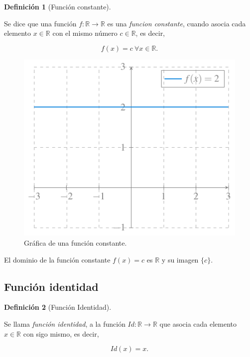 \documentclass[
  a4paper,
]{scrreport}
\theoremstyle{definition}
\theoremstyle{plain}
\theoremstyle{definition}
\newtheorem{definition}{Definición}[chapter]
\theoremstyle{definition}
\theoremstyle{plain}
\theoremstyle{plain}
\theoremstyle{remark}
\begin{document}
\begin{definition}[Función
constante]\protect\hypertarget{def-funcion-constante}{}\label{def-funcion-constante}

Se dice que una función \(f: \mathbb{R}\rightarrow \mathbb{R}\) es una
\emph{funcion constante}, cuando asocia cada elemento
\(x\in \mathbb{R}\) con el mismo número \(c\in\mathbb{R}\), es decir,

\[f(x)=c\ \forall x\in\mathbb{R}.\]

\end{definition}

\begin{figure}[H]

{\centering \includegraphics{./img/funciones/funcion-constante.pdf}

}

\caption{Gráfica de una función constante.}

\end{figure}%

El dominio de la función constante \(f(x)=c\) es \(\mathbb{R}\) y su
imagen \(\{c\}\).

\subsection{Función identidad}\label{funciuxf3n-identidad-1}

\begin{definition}[Función
Identidad]\protect\hypertarget{def-funcion-identidad}{}\label{def-funcion-identidad}

Se llama \emph{función identidad}, a la función
\(Id: \mathbb{R}\rightarrow \mathbb{R}\) que asocia cada elemento
\(x\in \mathbb{R}\) con sigo mismo, es decir,

\[Id(x)=x.\]

\end{definition}
\end{document}
